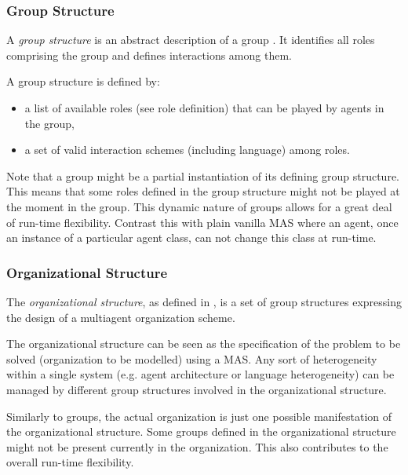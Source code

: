 \subsubsection*{Group Structure}

A \textit{group structure} is an abstract description of a group \cite{Ferber97}.
It identifies all roles comprising the group and defines interactions among them.

A group structure is defined by:
\begin{itemize}
	\item a list of available roles (see role definition) that can be played by agents in the group,
	\item a set of valid interaction schemes (including language) among roles.
\end{itemize}

Note that a group might be a partial instantiation of its defining group structure.
This means that some roles defined in the group structure might not be played at the moment in the group.
This dynamic nature of groups allows for a great deal of run-time flexibility.
Contrast this with plain vanilla MAS where an agent, once an instance of a particular agent class, can not change this class at run-time.

\subsubsection*{Organizational Structure}

The \textit{organizational structure}, as defined in \cite{Ferber97}, is a set of group structures expressing the design of a multiagent organization scheme.

The organizational structure can be seen as the specification of the problem to be solved (organization to be modelled) using a MAS.
Any sort of heterogeneity within a single system (e.g. agent architecture or language heterogeneity) can be managed by different group structures involved in the organizational structure.

Similarly to groups, the actual organization is just one possible manifestation of the organizational structure.
Some groups defined in the organizational structure might not be present currently in the organization.
This also contributes to the overall run-time flexibility.

